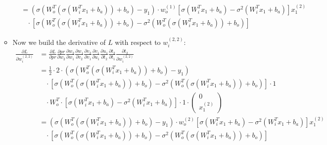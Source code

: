 \documentclass[a4paper]{article}
\begin{document}
\begin{itemize}
\begin{itemize}
\begin{align*}
                            &= (\sigma(W_o^T(\sigma(W_i^T x_1 + b_a)) + b_o) - y_1) \cdot w_o^{(1)} [\sigma(W_i^T x_1 + b_a) - \sigma^2(W_i^T x_1 + b_a)] x_1^{(2)}\\
                            &\ \ \ \ \cdot [\sigma(W_o^T(\sigma(W_i^T x_1 + b_a)) + b_o) - \sigma^2(W_o^T(\sigma(W_i^T x_1 + b_a)) + b_o)]
                        \end{align*}
                    \item Now we build the derivative of $L$ with respect to $w_i^{(2,2)}$:
                        \begin{align*}
                            \frac{\partial L}{\partial w_i^{(2,2)}} &= \frac{\partial L}{\partial pr} \frac{\partial pr}{\partial w_2} 
                            \frac{\partial w_2}{\partial w_1} \frac{\partial w_1}{\partial v_2} \frac{\partial v_2}{\partial v_1}
                            \frac{\partial v_1}{\partial u_1} \frac{\partial u_1}{\partial t_2} \frac{\partial t_2}{\partial t_1} \frac{\partial t_2}{\partial w_i^{(2,2)}}\\
                            &= \frac{1}{2} \cdot 2 \cdot (\sigma(W_o^T(\sigma(W_i^T x_1 + b_a)) + b_o) - y_1)\\
                            &\ \ \ \ \cdot [\sigma(W_o^T(\sigma(W_i^T x_1 + b_a)) + b_o) - \sigma^2(W_o^T(\sigma(W_i^T x_1 + b_a)) + b_o)] \cdot 1\\
                            &\ \ \ \ \cdot W_o^T \cdot [\sigma(W_i^T x_1 + b_a) - \sigma^2(W_i^T x_1 + b_a)] \cdot 1 
                            \cdot \left(\begin{matrix} 0 \\ x_1^{(2)} \end{matrix} \right)\\
                            &= (\sigma(W_o^T(\sigma(W_i^T x_1 + b_a)) + b_o) - y_1) \cdot w_o^{(2)} [\sigma(W_i^T x_1 + b_a) - \sigma^2(W_i^T x_1 + b_a)] x_1^{(2)}\\
                            &\ \ \ \ \cdot [\sigma(W_o^T(\sigma(W_i^T x_1 + b_a)) + b_o) - \sigma^2(W_o^T(\sigma(W_i^T x_1 + b_a)) + b_o)]
                        \end{align*}
                \end{itemize}
            

\end{itemize}
\end{document}
